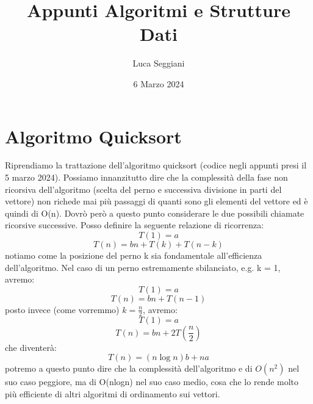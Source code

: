 \documentclass[a4paper,12pt]{article}
\title{Appunti Algoritmi e Strutture Dati}
\author{Luca Seggiani}
\date{6 Marzo 2024}
\begin{document}
\maketitle
\section{Algoritmo Quicksort}
Riprendiamo la trattazione dell'algoritmo quicksort (codice negli appunti
presi il 5 marzo 2024). Possiamo innanzitutto dire che la complessità della fase
non ricorsiva dell'algoritmo (scelta del perno e successiva divisione
in parti del vettore) non richede mai più passaggi di quanti sono
gli elementi del vettore ed è quindi di O(n). Dovrò però a questo
punto considerare le due possibili chiamate ricorsive successive. Posso definire
la seguente relazione di ricorrenza:
$$ T(1) = a $$
$$ T(n) = bn + T(k) + T(n - k) $$
notiamo come la posizione del perno k sia fondamentale all'efficienza dell'algoritmo.
Nel caso di un perno estremamente sbilanciato, e.g. k = 1, avremo:
$$ T(1) = a $$
$$ T(n) = bn + T(n - 1) $$
posto invece (come vorremmo) $k =\frac{n}{2}$, avremo:
$$ T(1) = a $$
$$ T(n) = bn + 2T(\frac{n}{2}) $$
che diventerà:
$$ T(n) = (n\log{n})b + na $$
potremo a questo punto dire che la complessità dell'algoritmo e di $O(n^2)$ nel suo
caso peggiore, ma di O(nlogn) nel suo caso medio, cosa che lo rende molto
più efficiente di altri algoritmi di ordinamento sui vettori.
\end{document}
